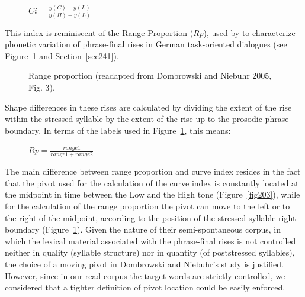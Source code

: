 \begin{description}
   \item[] \(Ci=\frac{y(C)-y(L)}{y(H)-y(L)}\)
\end{description}

This index is reminiscent of the Range Proportion (\textit{Rp}), used by \citet{dombrowski2005acoustic} to characterize phonetic variation of phrase-final rises in German task-oriented dialogues (see Figure~\ref{fig205} and Section~\ref{sec241}). 

\begin{figure}
\centering
{}
\caption{Range proportion (readapted from Dombrowski and Niebuhr 2005, Fig. 3).}
\label{fig205}\end{figure}

Shape differences in these rises are calculated by dividing the extent of the rise within the stressed syllable by the extent of the rise up to the prosodic phrase boundary. In terms of the labels used in Figure~\ref{fig205}, this means:

\begin{description}
   \item[] \(Rp=\frac{range1}{range1+range2}\)
\end{description}

The main difference between range proportion and curve index resides in the fact that the pivot used for the calculation of the curve index is constantly located at the midpoint in time between the Low and the High tone (Figure~\ref{fig203}), while for the calculation of the range proportion the pivot can move to the left or to the right of the midpoint, according to the position of the stressed syllable right boundary (Figure~\ref{fig205}). Given the nature of their semi-spontaneous corpus, in which the lexical material associated with the phrase-final rises is not controlled neither in quality (syllable structure) nor in quantity (of poststressed syllables), the choice of a moving pivot in Dombrowski and Niebuhr's study is justified. However, since in our read corpus the target words are strictly controlled, we considered that a tighter definition of pivot location could be easily enforced.

